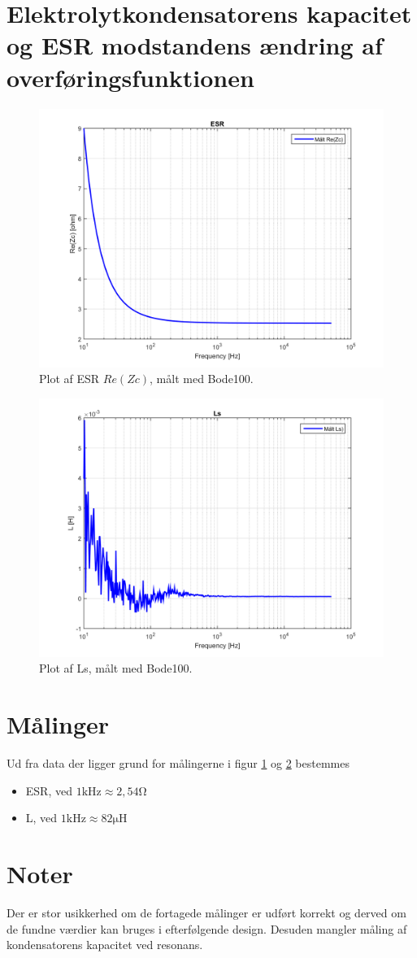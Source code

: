 \section{Elektrolytkondensatorens kapacitet og ESR modstandens ændring af overføringsfunktionen}\label{sec:spm4}

\begin{figure}[h!]
	\centering
	\includegraphics[width=.5\textwidth]{reg1/esrplot.png}
	\caption{Plot af ESR $Re(Zc)$, målt med Bode100.}
	\label{fig:esrplot}
\end{figure}
\FloatBlock

\begin{figure}[h!]
	\centering
	\includegraphics[width=.5\textwidth]{reg1/lsplot.png}
	\caption{Plot af Ls, målt med Bode100.}
	\label{fig:lsplot}
\end{figure}
\FloatBlock
\section*{Målinger}
Ud fra data der ligger grund for målingerne i figur \ref{fig:esrplot} og \ref{fig:lsplot} bestemmes
\begin{itemize}
	\item ESR, ved $1 \si{\kilo\hertz} \approx 2,54 \si{\ohm}$
	\item L, ved $1 \si{\kilo\hertz} \approx 82 \si{\micro\henry}$
\end{itemize} 

\section*{Noter}
Der er stor usikkerhed om de fortagede målinger er udført korrekt og derved om de fundne værdier kan bruges i efterfølgende design.
Desuden mangler måling af kondensatorens kapacitet ved resonans.
